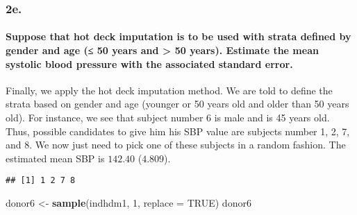 \documentclass[
]{article}
\newenvironment{Shaded}{\begin{snugshade}}{\end{snugshade}}
\newcommand{\DataTypeTok}[1]{\textcolor[rgb]{0.13,0.29,0.53}{#1}}
\newcommand{\DecValTok}[1]{\textcolor[rgb]{0.00,0.00,0.81}{#1}}
\newcommand{\KeywordTok}[1]{\textcolor[rgb]{0.13,0.29,0.53}{\textbf{#1}}}
\newcommand{\NormalTok}[1]{#1}
\newcommand{\OperatorTok}[1]{\textcolor[rgb]{0.81,0.36,0.00}{\textbf{#1}}}
\newcommand{\OtherTok}[1]{\textcolor[rgb]{0.56,0.35,0.01}{#1}}
\newcommand{\StringTok}[1]{\textcolor[rgb]{0.31,0.60,0.02}{#1}}
\begin{document}
\hypertarget{e.}{%
\subsubsection{2e.}\label{e.}}

\hypertarget{suppose-that-hot-deck-imputation-is-to-be-used-with-strata-defined-by-gender-and-age-50-years-and-50-years.-estimate-the-mean-systolic-blood-pressure-with-the-associated-standard-error.}{%
\paragraph{Suppose that hot deck imputation is to be used with strata
defined by gender and age (≤ 50 years and \textgreater{} 50 years).
Estimate the mean systolic blood pressure with the associated standard
error.}\label{suppose-that-hot-deck-imputation-is-to-be-used-with-strata-defined-by-gender-and-age-50-years-and-50-years.-estimate-the-mean-systolic-blood-pressure-with-the-associated-standard-error.}}

Finally, we apply the hot deck imputation method. We are told to define
the strata based on gender and age (younger or 50 years old and older
than 50 years old). For instance, we see that subject number 6 is male
and is 45 years old. Thus, possible candidates to give him his SBP value
are subjects number 1, 2, 7, and 8. We now just need to pick one of
these subjects in a random fashion. The estimated mean SBP is \(142.40\)
(\(4.809\)).

\begin{Shaded}
\end{Shaded}

\begin{verbatim}
## [1] 1 2 7 8
\end{verbatim}

\begin{Shaded}
\begin{Highlighting}[]
\NormalTok{donor6 \textless{}{-}}\StringTok{ }\KeywordTok{sample}\NormalTok{(indhdm1, }\DecValTok{1}\NormalTok{, }\DataTypeTok{replace =} \OtherTok{TRUE}\NormalTok{)}
\NormalTok{donor6}
\end{Highlighting}
\end{Shaded}
\end{document}
